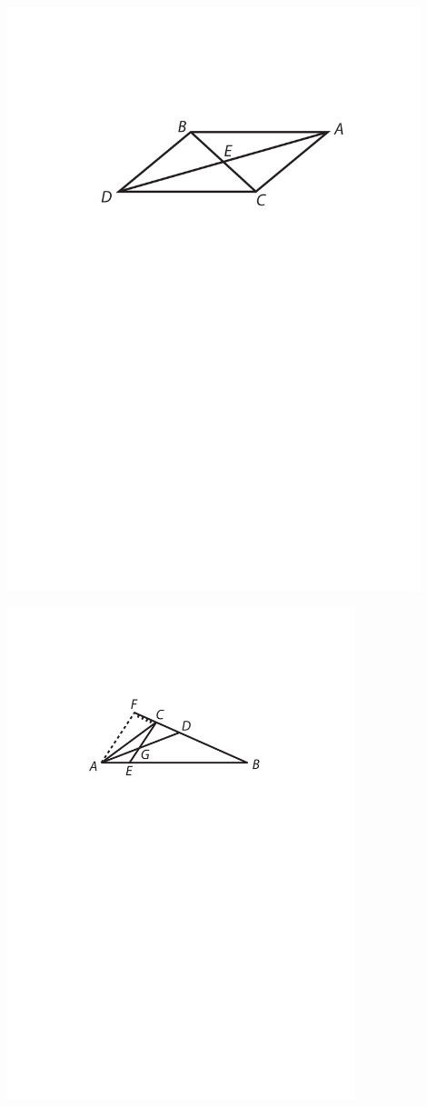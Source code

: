 \begin{minipage}[t]{0.5\textwidth}
\includegraphics[width=0.9\textwidth]{images/LH03705_216r-d4.pdf}
\end{minipage}
\begin{minipage}[t]{0.5\textwidth}
\includegraphics[width=0.76\textwidth]{images/LH03705_216r-d5.pdf}\\
\end{minipage}
